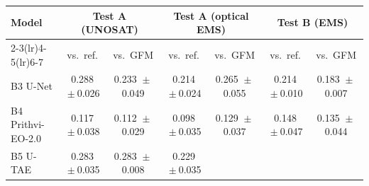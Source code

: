 \begin{tabular}{lcccccc}
\toprule
Model & \multicolumn{2}{c}{Test A (UNOSAT)} & \multicolumn{2}{c}{Test A (optical EMS)} & \multicolumn{2}{c}{Test B (EMS)} \\
\cmidrule(lr){2-3}\cmidrule(lr){4-5}\cmidrule(lr){6-7}
 & vs.\ ref. & vs.\ GFM & vs.\ ref. & vs.\ GFM & vs.\ ref. & vs.\ GFM \\
\midrule
B3 U-Net
& 0.288%
${}\pm{}$0.026%
& 0.233%
${}\pm{}$0.049%
& 0.214%
${}\pm{}$0.024%
& 0.265%
${}\pm{}$0.055%
& 0.214%
${}\pm{}$0.010%
& 0.183%
${}\pm{}$0.007%
\\
B4 Prithvi-EO-2.0
& 0.117%
${}\pm{}$0.038%
& 0.112%
${}\pm{}$0.029%
& 0.098%
${}\pm{}$0.035%
& 0.129%
${}\pm{}$0.037%
& 0.148%
${}\pm{}$0.047%
& 0.135%
${}\pm{}$0.044%
\\
B5 U-TAE
& 0.283%
${}\pm{}$0.035%
& 0.283%
${}\pm{}$0.008%
& 0.229%
${}\pm{}$0.035%

\end{tabular}
